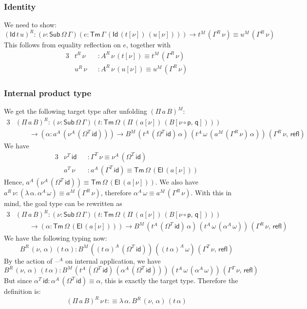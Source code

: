 \documentclass[12pt,a4paper,twoside,openany]{book}
\theoremstyle{remark}
\theoremstyle{definition}
\theoremstyle{theorem}
\newcommand{\refl}{\mathsf{refl}}
\newcommand{\id}{\mathsf{id}}
\newcommand{\Sub}{\mathsf{Sub}}
\newcommand{\Tm}{\mathsf{Tm}}
\newcommand{\El}{\mathsf{El}}
\newcommand{\Id}{\mathsf{Id}}
\newcommand{\blank}{\mathord{\hspace{1pt}\text{--}\hspace{1pt}}}
\newcommand{\p}{\mathsf{p}}
\newcommand{\q}{\mathsf{q}}
\newcommand{\defn}{:\equiv}
\begin{document}
\subsubsection{Identity}

We need to show:
\[
(\Id\,t\,u)^R : (\nu : \Sub\,\Omega\,\Gamma)(e : \Tm\,\Gamma\,(\Id\,(t[\nu])\,(u[\nu])))
  \to t^M\,(\Gamma^R\,\nu) \equiv u^M\,(\Gamma^R\,\nu)
  \]
This follows from equality reflection on $e$, together with
\begin{alignat*}{3}
  & t^R\,\nu &&: A^R\,\nu\,(t[\nu]) \equiv t^M\,(\Gamma^R\,\nu)\\
  & u^R\,\nu &&: A^R\,\nu\,(u[\nu]) \equiv u^M\,(\Gamma^R\,\nu)
\end{alignat*}

\subsubsection{Internal product type}
We get the following target type after unfolding $(\Pi\,a\,B)^M$:
\begin{alignat*}{3}
 &(\Pi\,a\,B)^R : (\nu : \Sub\,\Omega\,\Gamma)(t : \Tm\,\Omega\,(\Pi\,(a[\nu])\,(B[\nu\circ\p,\,\q])))\\
 & \hspace{2em}\to (\alpha : a^A\,(\nu^A\,(\Omega^T\,\id))) \to B^M\,(t^A\,(\Omega^T\,\id)\,\alpha)\,(t^A\,\omega\,(a^M\,(\Gamma^R\,\nu)\,\alpha))\,(\Gamma^R\,\nu,\,\refl)
\end{alignat*}
We have
\begin{alignat*}{3}
  & \nu^T\,\id &&: \Gamma^T\,\nu \equiv \nu^A\,(\Omega^T\,\id) \\
  & a^T\,\nu   &&: a^A\,(\Gamma^T\,\id) \equiv \Tm\,\Omega\,(\El\,(a[\nu]))
\end{alignat*}
Hence, $a^A\,(\nu^A\,(\Omega^T\,\id)) \equiv \Tm\,\Omega\,(\El\,(a[\nu]))$. We
also have $a^R\,\nu : (\lambda\,\alpha.\,\alpha^A\,\omega) \equiv a^M\,(\Gamma^R\,\nu)$, therefore
$\alpha^A\,\omega \equiv a^M\,(\Gamma^R\,\nu)$. With this in mind, the goal type can be rewritten as
\begin{alignat*}{3}
 &(\Pi\,a\,B)^R : (\nu : \Sub\,\Omega\,\Gamma)(t : \Tm\,\Omega\,(\Pi\,(a[\nu])\,(B[\nu\circ\p,\,\q])))\\
 & \hspace{2em}\to (\alpha : \Tm\,\Omega\,(\El\,(a[\nu]))) \to B^M\,(t^A\,(\Omega^T\,\id)\,\alpha)\,(t^A\,\omega\,(\alpha^A\,\omega))\,(\Gamma^R\,\nu,\,\refl)
\end{alignat*}
We have the following typing now:
\[
  B^R\,(\nu,\,\alpha)\,(t\,\alpha) : B^M\,((t\,\alpha)^A\,(\Omega^T\,\id))\,((t\,\alpha)^A\,\omega)\,(\Gamma^T\,\nu,\,\refl)
\]
By the action of $\blank^A$ on internal application, we have
\[
   B^R\,(\nu,\,\alpha)\,(t\,\alpha) :
      B^M\,(t^A\,(\Omega^T\,\id)\,(\alpha^A\,(\Omega^T\,\id)))\,(t^A\,\omega\,(\alpha^A\,\omega))\,(\Gamma^T\,\nu,\,\refl)
\]
But since $\alpha^T\,\id : \alpha^A\,(\Omega^T\,\id) \equiv \alpha$, this is
exactly the target type. Therefore the definition is:
\[
  (\Pi\,a\,B)^R\,\nu\,t \defn \lambda\,\alpha.\,B^R\,(\nu,\,\alpha)\,(t\,\alpha)
\]
\end{document}

